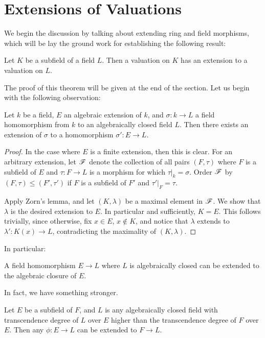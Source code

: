\section{Extensions of Valuations}

We begin the discussion by talking about extending ring and field 
morphisms, which will be lay the ground work for establishing the 
following result:

\begin{thm}\label{thm_ext_val}
Let $K$ be a subfield of a field $L$. Then a valuation on $K$ has 
an extension to a valuation on $L$.
\end{thm}

The proof of this theorem will be given at the end of the section.
Let us begin with the following observation:

\begin{prop}
Let $k$ be a field, $E$ an algebraic extension of $k$, and 
$\sigma: k \to L$ a field homomorphism from $k$ to an 
algebraically closed field $L$. Then there exists an extension of 
$\sigma$ to a homomorphism $\sigma': E \to L$.
\end{prop}

\begin{proof}
In the case where $E$ is a finite extension, then this is clear.
For an arbitrary extension, let $\mathscr{F}$ denote the collection
of all pairs $(F, \tau)$ where $F$ is a subfield of $E$ and 
$\tau: F \to L$ is a morphism for which $\tau|_k = \sigma$. 
Order $\mathscr{F}$ by $(F, \tau) \leq (F', \tau')$ if $F$ is a 
subfield of $F'$ and $\tau'|_F = \tau$.

Apply Zorn's lemma, and let $(K, \lambda)$ be a maximal element
in $\mathscr{F}$. We show that $\lambda$ is the desired extension to 
$E$. In particular and sufficiently, $K = E$. This follows 
trivially, since otherwise, fix $x \in E$, $x \notin K$, and 
notice that $\lambda$ extends to $\lambda': K(x) \to L$, 
contradicting the maximality of $(K, \lambda)$.
\end{proof}

In particular:

\begin{cor}
A field homomorphism $E \to L$ where $L$ is algebraically closed
can be extended to the algebraic closure of $E$.
\end{cor}

In fact, we have something stronger.

\begin{prop}
Let $E$ be a subfield of $F$, and $L$ is any algebraically closed
field with transcendence degree of $L$ over $E$ higher than the 
transcendence degree of $F$ over $E$. Then any $\phi: E \to L$ 
can be extended to $F \to L$.
\end{prop}

